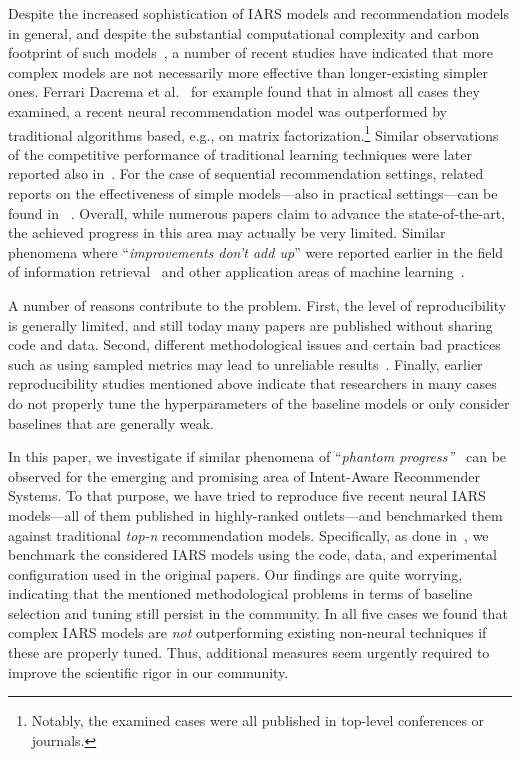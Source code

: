 \documentclass[sigconf,natbib=true,nonacm]{acmart}
\begin{document}
Despite the increased sophistication of IARS models and recommendation models in general, and despite the substantial computational complexity and carbon footprint of such models~\cite{Vente2024fromClicks,Spillo2024Towards}, a number of recent studies have indicated that more complex models are not necessarily more effective than longer-existing simpler ones. Ferrari Dacrema et al.~\cite{ferraridacremaetal2019,ferraridacrema2020tois} for example found that in almost all cases they examined, a recent neural recommendation model was outperformed by traditional algorithms based, e.g., on matrix factorization.\footnote{Notably, the examined cases were all published in top-level conferences or journals.} Similar observations of the competitive performance of traditional learning techniques were later reported also in~\cite{Rendle2020NeuMF,RendleKZK22Revisiting,anellitop2022,RevisitingBPR2024}. For the case of sequential recommendation settings, related reports on the effectiveness of simple models---also in practical settings---can be found in ~\cite{latifi2021ins,ludewiglatifiumuai2020,Kouki2020RecSys,Kersbergen2022Serenade,shehzad2024performance}. Overall, while numerous papers claim to advance the state-of-the-art, the achieved progress in this area may actually be very limited. Similar phenomena where ``\emph{improvements don't add up}'' were reported earlier in the field of information retrieval~\cite{Lin:2019:NHC:3308774.3308781,Armstrong:2009:IDA:1645953.1646031} and other application areas of machine learning~\cite{Makridakis2018}.

A number of reasons contribute to the problem. First, the level of reproducibility is generally limited, and still today many papers are published without sharing code and data. Second, different methodological issues and certain bad practices such as using sampled metrics may lead to unreliable results~\cite{Krichene2022Sampled}. Finally, earlier reproducibility studies mentioned above indicate that researchers in many cases do not properly tune the hyperparameters of the baseline models or only consider baselines that are generally weak.

In this paper, we investigate if similar phenomena of ``\emph{phantom progress''}~\cite{ferraridacremaetal2019} can be observed for the emerging and promising area of Intent-Aware Recommender Systems. To that purpose, we have tried to reproduce five recent neural IARS models---all of them published in highly-ranked outlets---and benchmarked them against traditional \emph{top-n} recommendation models. Specifically, as done in~\cite{ferraridacremaetal2019}, we benchmark the considered IARS models using the code, data, and experimental configuration used in the original papers. Our findings are quite worrying, indicating that the mentioned methodological problems in terms of baseline selection and tuning still persist in the community. In all five cases we found that complex IARS models are \emph{not} outperforming existing non-neural techniques if these are properly tuned. Thus, additional measures seem urgently required to improve the scientific rigor in our community.
\end{document}
